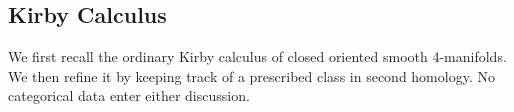 \subsection{Kirby Calculus}
\label{sec:kirby-presentations}

We first recall the ordinary Kirby calculus of closed oriented smooth
4-manifolds.  We then refine it by keeping track of a prescribed class in
second homology.  No categorical data enter either discussion.




